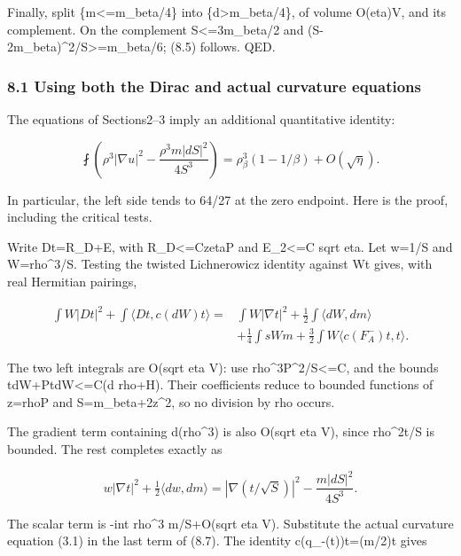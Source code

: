 \documentclass[
  10pt,
]{article}
\begin{document}
Finally, split \{m\textless=m\_beta/4\} into
\{d\textgreater m\_beta/4\}, of volume O(eta)V, and its complement. On
the complement S\textless=3m\_beta/2 and
(S-2m\_beta)\^{}2/S\textgreater=m\_beta/6; (8.5) follows. QED.

\hypertarget{using-both-the-dirac-and-actual-curvature-equations}{%
\subsubsection{8.1 Using both the Dirac and actual curvature
equations}\label{using-both-the-dirac-and-actual-curvature-equations}}

The equations of Sections2--3 imply an additional quantitative identity:

\[
 \boxed{\fint\left(\rho^3|\nabla u|^2-
            \frac{\rho^3m|dS|^2}{4S^3}\right)
       =\rho_\beta^3(1-1/\beta)+O(\sqrt\eta).}         \tag{8.6}
\]

In particular, the left side tends to 64/27 at the zero endpoint. Here
is the proof, including the critical tests.

Write Dt=R\_D+E, with
\textbar R\_D\textbar\textless=C\textbar zeta\textbar\textbar P\textbar{}
and \textbar\textbar E\textbar\textbar\_2\textless=C sqrt eta. Let w=1/S
and W=rho\^{}3/S. Testing the twisted Lichnerowicz identity against Wt
gives, with real Hermitian pairings,

\[
\begin{aligned}
 \int W|Dt|^2+\int\langle Dt,c(dW)t\rangle
  ={}&\int W|\nabla t|^2+\tfrac12\int\langle dW,dm\rangle\\
    &+\tfrac14\int sWm
      +\tfrac32\int W\langle c(F_A^-)t,t\rangle.       
\end{aligned}\tag{8.7}
\]

The two left integrals are O(sqrt eta V): use
rho\^{}3\textbar P\textbar\^{}2/S\textless=C, and the bounds
\textbar t\textbar\textbar dW\textbar+\textbar P\textbar\textbar t\textbar\textbar dW\textbar\textless=C(\textbar d
rho\textbar+\textbar H\textbar). Their coefficients reduce to bounded
functions of z=rho\textbar P\textbar{} and S=m\_beta+2z\^{}2, so no
division by rho occurs.

The gradient term containing d(rho\^{}3) is also O(sqrt eta V), since
rho\^{}2\textbar t\textbar/S is bounded. The rest completes exactly as

\[
 w|\nabla t|^2+\tfrac12\langle dw,dm\rangle
   =|\nabla(t/\sqrt S)|^2-\frac{m|dS|^2}{4S^3}.       \tag{8.8}
\]

The scalar term is -int rho\^{}3 m/S+O(sqrt eta V). Substitute the
actual curvature equation (3.1) in the last term of (8.7). The identity
c(q\_-(t))t=(m/2)t gives
\end{document}
